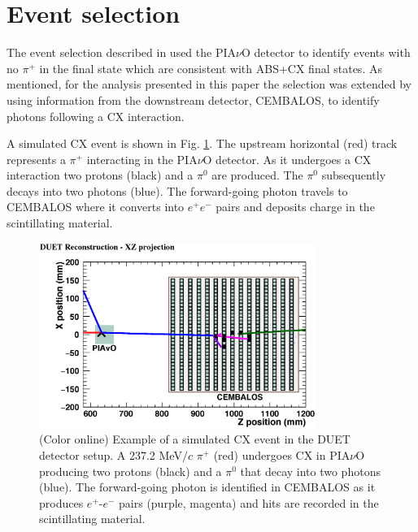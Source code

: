 \section{\label{sec:selection}Event selection}
The event selection described in \cite{duet} used the PIA$\nu$O detector to identify events with no $\pi^{+}$ in the final state which are consistent with ABS+CX final states. As mentioned, for the analysis presented in this paper the selection was extended by using information from the downstream detector, CEMBALOS, to identify photons following a CX interaction. 

A simulated CX event is shown in Fig. \ref{fig:event}. The upstream horizontal (red) track represents a $\pi^{+}$ interacting in the PIA$\nu$O detector. As it undergoes a CX interaction two protons (black) and a $\pi^{0}$ are produced. The $\pi^{0}$ subsequently decays into two photons (blue). The forward-going photon travels to CEMBALOS where it converts into $e^{+}$$e^{-}$ pairs and deposits charge in the scintillating material.

\begin{figure}[ht]
\includegraphics[width=90mm]{figures/event_display_without_diagram.eps}
\caption{(Color online) Example of a simulated CX event in the DUET detector setup. A 237.2 MeV$/c$ $\pi^+$ (red) undergoes CX in PIA$\nu$O producing two protons (black) and a $\pi^0$ that decay into two photons (blue). The forward-going photon is identified in CEMBALOS as it produces $e^{+}$-$e^{-}$ pairs (purple, magenta) and hits are recorded in the scintillating material.}
\label{fig:event}
\end{figure}

